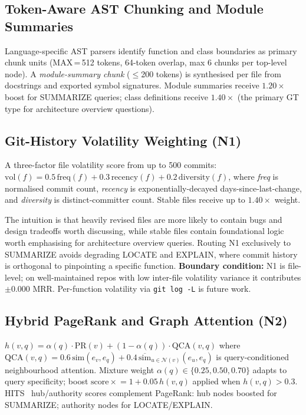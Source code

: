\documentclass[runningheads]{llncs}
\begin{document}
\subsection{Token-Aware AST Chunking and Module Summaries}

Language-specific AST parsers identify function and class boundaries as
primary chunk units (MAX\,=\,512 tokens, 64-token overlap, max 6 chunks
per top-level node). A \emph{module-summary chunk} ($\leq$200 tokens) is
synthesised per file from docstrings and exported symbol signatures.
Module summaries receive $1.20\times$ boost for SUMMARIZE queries; class
definitions receive $1.40\times$ (the primary GT type for architecture
overview questions).

\subsection{Git-History Volatility Weighting (N1)}

A three-factor file volatility score from up to 500 commits:
$\text{vol}(f) = 0.5\,\text{freq}(f) + 0.3\,\text{recency}(f) + 0.2\,\text{diversity}(f)$,
where \textit{freq} is normalised commit count, \textit{recency} is
exponentially-decayed days-since-last-change, and \textit{diversity} is
distinct-committer count. Stable files receive up to $1.40\times$ weight.

The intuition is that heavily revised files are more likely to contain
bugs and design tradeoffs worth discussing, while stable files contain
foundational logic worth emphasising for architecture overview queries.
Routing N1 exclusively to SUMMARIZE avoids degrading LOCATE and EXPLAIN,
where commit history is orthogonal to pinpointing a specific function.
\textbf{Boundary condition:} N1 is file-level; on well-maintained repos
with low inter-file volatility variance it contributes $\pm$0.000 MRR.
Per-function volatility via \texttt{git log -L} is future work.

\subsection{Hybrid PageRank and Graph Attention (N2)}

$h(v,q) = \alpha(q)\cdot\text{PR}(v) + (1{-}\alpha(q))\cdot\text{QCA}(v,q)$
where $\text{QCA}(v,q) = 0.6\,\text{sim}(e_v, e_q) + 0.4\,\overline{\text{sim}}_{u\in\mathcal{N}(v)}(e_u, e_q)$
is query-conditioned neighbourhood attention. Mixture weight $\alpha(q)\in\{0.25, 0.50, 0.70\}$
adapts to query specificity; boost $\text{score}\mathrel{\times}=1+0.05\,h(v,q)$
applied when $h(v,q)>0.3$. HITS~\cite{kleinberg1999hits} hub/authority
scores complement PageRank: hub nodes boosted for SUMMARIZE; authority
nodes for LOCATE/EXPLAIN.
\end{document}
